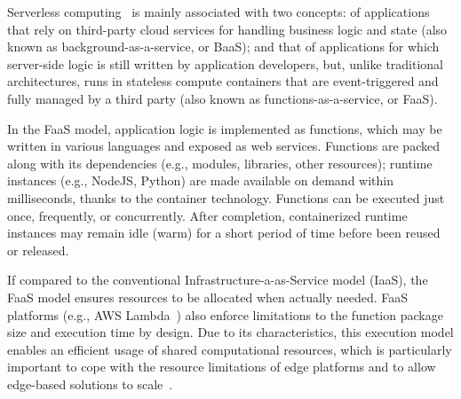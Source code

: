 Serverless computing~\cite{Lloyd18serverless,Roberts:2018} is mainly associated with two concepts: of applications that rely on third-party cloud services for handling business logic and state (also known as background-as-a-service, or BaaS); and that of applications for which server-side logic is still written by application developers, but, unlike traditional architectures, runs in stateless compute containers that are event-triggered
and fully managed by a third party (also known as functions-as-a-service, or FaaS).

In the FaaS model, application logic is implemented as functions, which may be written in various languages and exposed as web services. Functions are packed along with its dependencies (e.g., modules, libraries, other resources); runtime instances (e.g., NodeJS, Python) are made available on demand within milliseconds, thanks to the container technology. Functions can be executed just once, frequently, or concurrently. After completion, containerized runtime instances may remain idle (warm) for a short period of time before been reused or released.

If compared to the conventional Infrastructure-a-as-Service model (IaaS), the FaaS model ensures resources to be allocated when actually needed. FaaS platforms (e.g., AWS Lambda~\cite{AWSLambda}) also enforce limitations to the function package size and execution time by design. Due to its characteristics, this execution model enables an efficient usage of shared computational resources, which is particularly important to cope with the resource limitations of edge platforms and to allow edge-based solutions to scale~\cite{GarrigaMendonca2017}.





%



